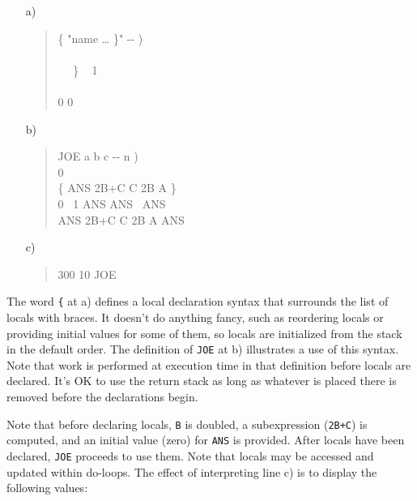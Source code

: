 \begin{enumerate}
\item[a)] \begin{quote}\ttfamily
	\word{:} \{	 "name {\ldots} \}" -{}- ) \\
	\tab {} ~   \\
	\tab~~   \word{[CHAR]} \} \word{-} ~
		 1 \word{-} ~
		  \\
	\tab~~  \\
	\tab {}  0 0 \\
	\word{;} 
	\end{quote}

\item[b)] \begin{quote}\ttfamily
	\word{:} JOE  a b c -{}- n ) \\
	\tab {}    \word{+} 0 \\
	\tab \{ ANS 2B+C C 2B A \} \\
	 0 
		~1 ANS \word{+}  \word{+}  ANS
		~ANS  
	~ \\
	\tab ANS  2B+C  C  2B  A   ANS \\
	\word{;}
	\end{quote}

\item[c)] \begin{quote} 300 10 JOE 
	\end{quote}
\end{enumerate}

The word \texttt{\{} at a) defines a local declaration syntax that
surrounds the list of locals with braces. It doesn't do anything fancy,
such as reordering locals or providing initial values for some of them,
so locals are initialized from the stack in the default order. The
definition of \texttt{JOE} at b) illustrates a use of this syntax. Note
that work is performed at execution time in that definition before
locals are declared. It's OK to use the return stack as long as whatever
is placed there is removed before the declarations begin.

Note that before declaring locals, \texttt{B} is doubled, a
subexpression (\texttt{2B+C}) is computed, and an initial value (zero)
for \texttt{ANS} is provided. After locals have been declared,
\texttt{JOE} proceeds to use them. Note that locals may be accessed and
updated within do-loops. The effect of interpreting line c) is to
display the following values:

